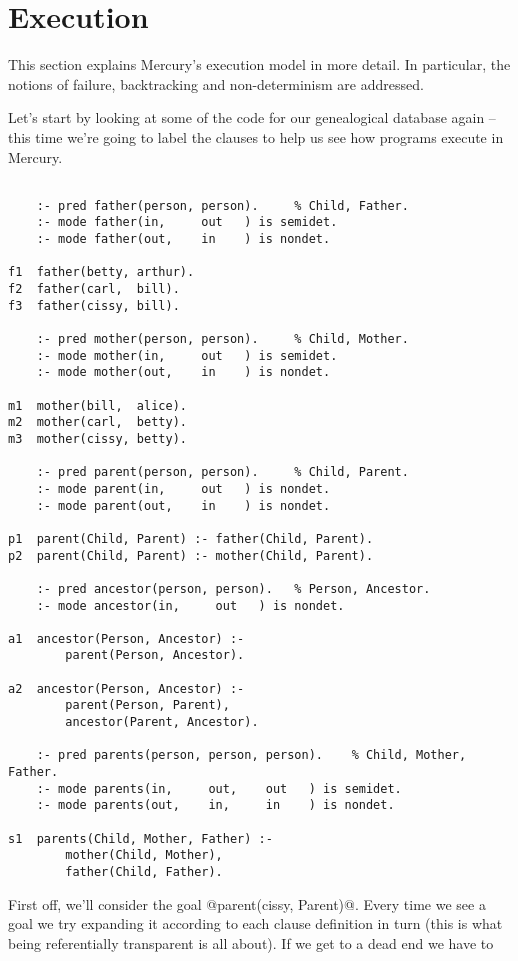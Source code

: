 \section{Execution}
This section explains Mercury's execution model in more
detail.  In particular, the notions of failure, backtracking
and non-determinism are addressed.

Let's start by looking at some of the code for our
genealogical database again -- this time we're going to label
the clauses to help us see how programs execute in Mercury.
\begin{verbatim}

    :- pred father(person, person).     % Child, Father.
    :- mode father(in,     out   ) is semidet.
    :- mode father(out,    in    ) is nondet.

f1  father(betty, arthur).
f2  father(carl,  bill).
f3  father(cissy, bill).

    :- pred mother(person, person).     % Child, Mother.
    :- mode mother(in,     out   ) is semidet.
    :- mode mother(out,    in    ) is nondet.

m1  mother(bill,  alice).
m2  mother(carl,  betty).
m3  mother(cissy, betty).

    :- pred parent(person, person).     % Child, Parent.
    :- mode parent(in,     out   ) is nondet.
    :- mode parent(out,    in    ) is nondet.

p1  parent(Child, Parent) :- father(Child, Parent).
p2  parent(Child, Parent) :- mother(Child, Parent).

    :- pred ancestor(person, person).   % Person, Ancestor.
    :- mode ancestor(in,     out   ) is nondet.

a1  ancestor(Person, Ancestor) :-
        parent(Person, Ancestor).

a2  ancestor(Person, Ancestor) :-
        parent(Person, Parent),
        ancestor(Parent, Ancestor).

    :- pred parents(person, person, person).    % Child, Mother, Father.
    :- mode parents(in,     out,    out   ) is semidet.
    :- mode parents(out,    in,     in    ) is nondet.

s1  parents(Child, Mother, Father) :-
        mother(Child, Mother),
        father(Child, Father).
\end{verbatim}
First off, we'll consider the goal @parent(cissy, Parent)@.
Every time we see a goal we try expanding it according to each
clause definition in turn (this is what being referentially
transparent is all about).  If we get to a dead end we have to
